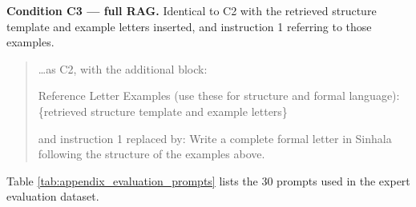 \documentclass[12pt]{uomthesis}
\begin{document}
\begin{appendices}
\textbf{Condition C3 — full RAG.} Identical to C2 with the retrieved structure template and example letters inserted, and instruction 1 referring to those examples.

\begin{quote}
\small
\ldots as C2, with the additional block:

Reference Letter Examples (use these for structure and formal language):\\
\{retrieved structure template and example letters\}

and instruction 1 replaced by: Write a complete formal letter in Sinhala following the structure of the examples above.
\end{quote}


Table \ref{tab:appendix_evaluation_prompts} lists the 30 prompts used in the expert evaluation dataset.


\end{appendices}
\end{document}
